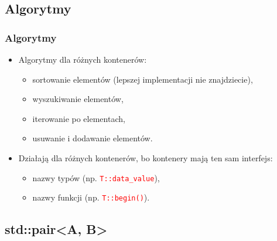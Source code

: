 \documentclass[compress]{beamer}
\newcommand{\red}[1]{\textcolor{red}{#1}}
\newcommand{\code}[1]{\texttt{\red{#1}}}
\begin{document}

\subsection{Algorytmy}

\begin{frame}

  \frametitle{Algorytmy}

  \begin{itemize}
  \item Algorytmy dla różnych kontenerów:
    \begin{itemize}
    \item sortowanie elementów (lepszej implementacji nie znajdziecie),
    \item wyszukiwanie elementów,
    \item iterowanie po elementach,
    \item usuwanie i dodawanie elementów.
    \end{itemize}
  \item Działają dla różnych kontenerów, bo kontenery mają ten sam
    interfejs:
    \begin{itemize}
      \item nazwy typów (np. \code{T::data\_value}),
      \item nazwy funkcji (np. \code{T::begin()}).
    \end{itemize}
  \end{itemize}

\end{frame}


\subsection{std::pair<A, B>}
\end{document}
